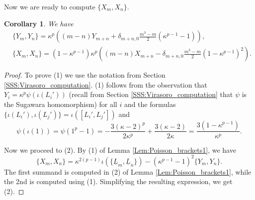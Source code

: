 \documentclass{amsart}
\newtheorem{Cor}[Thm]{Corollary}
\newtheorem{Lem}[Thm]{Lemma}
\theoremstyle{definition}
\newcommand{\sss}{\subsubsection{}}
\numberwithin{equation}{section}
\begin{document}
%

\sss Now we are ready to compute $\{X_m,X_n\}$.
\begin{Cor}\label{Cor:Y_brackets}
We have 
\begin{align*}
&\{Y_m,Y_n\}=\kappa^p\left((m-n) Y_{m+n}+\delta_{m+n,0}\frac{m^3-m}{2}(\kappa^{p-1}-1)\right),\\
&\{X_m,X_n\}=(1-\kappa^{p-1})\kappa^p\left((m-n)X_{m+n}-\delta_{m+n,0}\frac{m^3-m}{2}(1-\kappa^{p-1})^2\right).
\end{align*}
\end{Cor}
\begin{proof}
To prove (1) we use the notation from Section \ref{SSS:Virasoro_computation}.
(1) follows from the observation that $Y_i=\kappa^p\psi(\iota(L_i'))$ (recall from Section \ref{SSS:Virasoro_computation} that $\psi$ is the Sugawara homomorphism) for all $i$ 
and the formulas $\{\iota(L_i'),\iota(L_j')\}=\iota([L_i',L_j'])$ and $$\psi(\iota(1))=\psi(1^p-1)=-\frac{3(\kappa-2)^p}{2\kappa^p}+\frac{3(\kappa-2)}{2\kappa}=\frac{3(1-\kappa^{p-1})}{\kappa^p}.$$

Now we proceed to (2). By (1) of Lemma \ref{Lem:Poisson_brackets1}, 
we have$$\{X_m,X_n\}=\kappa^{2(p-1)}\iota(\{\underline{L}_m, \underline{L}_n\})-(\kappa^{p-1}-1)^2\{Y_m,Y_n\}.$$
The first summand is computed in (2) of Lemma \ref{Lem:Poisson_brackets1}, while the 2nd is computed using (1). Simplifying the resulting expression, we get (2).
\end{proof}
\end{document}
